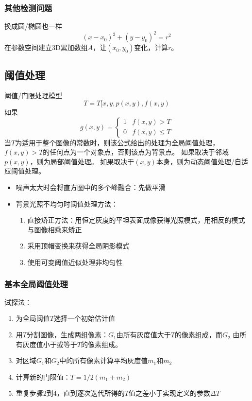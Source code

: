 \subsubsection{其他检测问题}
换成圆/椭圆也一样
\[(x-x_0)^2+(y-y_0)^2=r^2\]
在参数空间建立3D累加数组$A$，让$(x_0,y_0)$变化，计算$r$。


\subsection{阈值处理}
阈值/门限处理模型
\[T=T[x,y,p(x,y),f(x,y)\]
如果
\[g(x,y)=\begin{cases}
1 & f(x,y)>T\\
0 & f(x,y)\leq T
\end{cases}\]
当$T$为适用于整个图像的常数时，则该公式给出的处理为全局阈值处理，$f(x,y)>T$的任何点为一个对象点，否则该点为背景点。
如果取决于邻域$p(x,y)$，则为局部阈值处理。
如果取决于$(x,y)$本身，则为动态阈值处理/自适应阈值处理。

\begin{itemize}
\item 噪声太大时会将直方图中的多个峰融合：先做平滑
\item 背景光照不均匀时阈值处理方法：
\begin{enumerate}
	\item 直接矫正方法：用恒定灰度的平坦表面成像获得光照模式，用相反的模式与图像相乘来矫正
	\item 采用顶帽变换来获得全局阴影模式
	\item 使用可变阈值近似处理非均匀性
\end{enumerate}
\end{itemize}

\subsubsection{基本全局阈值处理}
试探法：
\begin{enumerate}
	\item 为全局阈值$T$选择一个初始估计值
	\item 用$T$分割图像，生成两组像素：$G_1$由所有灰度值大于$T$的像素组成，而$G_2$   由所有灰度值小于或等于$T$的像素组成。
	\item 对区域$G_1$和$G_2$中的所有像素计算平均灰度值$m_1$和$m_2$
	\item 计算新的门限值：$T=1/2(m_1+m_2)$
	\item 重复步骤2到4，直到逐次迭代所得的$T$值之差小于实现定义的参数$\Delta T$
\end{enumerate}

